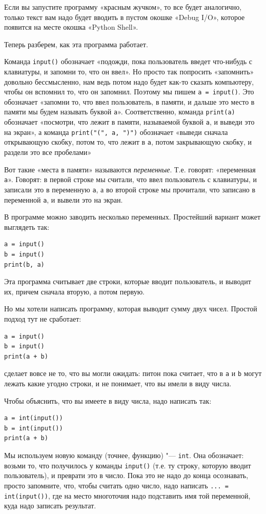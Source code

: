 Если вы запустите программу «красным жучком», то все будет аналогично, только текст вам надо
будет вводить в пустом окошке «Debug I/O», которое появится на месте окошка «Python Shell».

Теперь разберем, как эта программа работает.

Команда \verb`input()` обозначает «подожди, пока пользователь введет что-нибудь с клавиатуры, и запомни то, 
что он ввел». Но просто так попросить «запомнить» довольно бессмысленно, нам ведь потом надо будет как-то
сказать компьютеру, чтобы он вспомнил то, что он запомнил. Поэтому мы пишем \verb`a = input()`. Это 
обозначает «запомни то, что ввел пользователь, в памяти, и дальше это место в памяти 
мы будем называть буквой \verb`a`».
Соответственно, команда \verb`print(a)` обозначает «посмотри, что лежит в памяти, называемой буквой \verb`a`, 
и выведи это на экран», а команда \verb`print("(", a, ")")` обозначает «выведи сначала открывающую скобку, 
потом то, что лежит в \verb`a`, потом закрывающую скобку, и раздели это все пробелами»

Вот такие «места в памяти» называются \textit{переменные}. Т.е. говорят: «переменная \verb`a`». Говорят:
в первой строке мы считали, что ввел пользователь с клавиатуры, и записали это в переменную \verb`a`,
а во второй строке мы прочитали, что записано в переменной \verb`a`, и вывели это на экран.

В программе можно заводить несколько переменных. Простейший вариант может выглядеть так:
\begin{verbatim}
a = input()
b = input()
print(b, a)
\end{verbatim}

Эта программа считывает две строки, которые вводит пользователь, и выводит их, причем сначала вторую,
а потом первую.

Но мы хотели написать программу, которая выводит сумму двух чисел. Простой подход тут не сработает:
\begin{verbatim}
a = input()
b = input()
print(a + b)
\end{verbatim}
сделает вовсе не то, что вы могли ожидать: питон пока считает, что в \verb`a` и \verb`b` могут лежать
какие угодно строки, и не понимает, что вы имели в виду числа.

Чтобы объяснить, что вы имеете в виду числа, надо написать так:
\begin{verbatim}
a = int(input())
b = int(input())
print(a + b)
\end{verbatim}

Мы используем новую команду (точнее, функцию) "--- \verb`int`. Она обозначает: возьми то, что получилось у команды \verb`input()`
(т.е. ту строку, которую вводит пользователь), и преврати это в число. Пока это не надо до конца осознавать,
просто запомните, что, чтобы считать одно число, надо написать \verb`... = int(input())`, где на место
многоточия надо подставить имя той переменной, куда надо записать результат.

